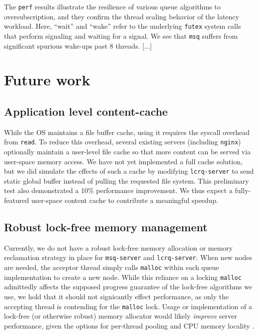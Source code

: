 \documentclass[twoside,10pt]{article}
\begin{document}
\begin{multicols}{2}
The \verb+perf+ results illustrate the resilience of various queue
algorithms to oversubscription, and they confirm the thread scaling
behavior of the latency workload. Here, ``wait'' and ``wake'' refer to
the underlying \verb+futex+ system calls that perform signaling and
waiting for a signal. We see that \verb+msq+ suffers from significant
spurious wake-ups past 8 threads. [...]

\section{Future work}

\subsection{Application level content-cache}
While the OS maintains a file buffer cache, using it requires the
syscall overhead from \verb+read+. To reduce this overhead, several
existing servers (including \verb+nginx+) optionally maintain a
user-level file cache so that more content can be served via
user-space memory access. We have not yet implemented a full cache
solution, but we did simulate the effects of such a cache by modifying
\verb+lcrq-server+ to send static global buffer instead of pulling the
requested file system. This preliminary test also demonstrated a 10\%
performance improvement. We thus expect a fully-featured user-space
content cache to contribute a meaningful speedup.

\subsection{Robust lock-free memory management}

Currently, we do not have a robust lock-free memory allocation or
memory reclamation strategy in place for \verb+msq-server+ and
\verb+lcrq-server+. When new nodes are needed, the acceptor thread
simply calls \verb+malloc+ within each queue implementation to create
a new node. While this reliance on a locking \verb+malloc+ admittedly
affects the supposed progress guarantee of the lock-free algorithms we
use, we hold that it should not signicantly effect performance, as
only the accepting thread is contending for the \verb+malloc+
lock. Usage or implementation of a lock-free (or otherwise robust)
memory allocator would likely \emph{improve} server performance, given the
options for per-thread pooling and CPU memory locality
\cite{hart2007performance}.


\end{multicols}
\end{document}
